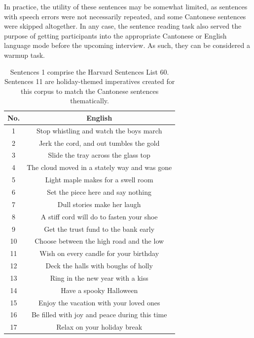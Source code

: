 In practice, the utility of these sentences may be somewhat limited, as sentences with speech errors were not necessarily repeated, and some Cantonese sentences were skipped altogether. In any case, the sentence reading task also served the purpose of getting participants into the appropriate Cantonese or English language mode before the upcoming interview. As such, they can be considered a warmup task. 

\begin{table}[!htbp]
\begin{center}
  \footnotesize
\begin{tabular}{c c}
\toprule
\textbf{No.}  & \textbf{English} \\
 \midrule
1 & Stop whistling and watch the boys march \\ 
2 & Jerk the cord, and out tumbles the gold \\ 
3 & Slide the tray across the glass top \\ 
4 & The cloud moved in a stately way and was gone \\ 
5 & Light maple makes for a swell room \\ 
6 & Set the piece here and say nothing \\ 
7 & Dull stories make her laugh \\ 
8 & A stiff cord will do to fasten your shoe \\ 
9 & Get the trust fund to the bank early \\ 
10 & Choose between the high road and the low \\ 
11 & Wish on every candle for your birthday \\ 
12 & Deck the halls with boughs of holly \\ 
13 & Ring in the new year with a kiss \\ 
14 & Have a spooky Halloween \\ 
15 & Enjoy the vacation with your loved ones \\ 
16 & Be filled with joy and peace during this time \\ 
17 & Relax on your holiday break \\ 
\bottomrule

\end{tabular}
\caption{Sentences 1 comprise the Harvard Sentences List 60. Sentences 11 are holiday-themed imperatives created for this corpus to match the Cantonese sentences thematically.}
\label{ch2:tab:eng_sent}
\end{center}
\end{table}

